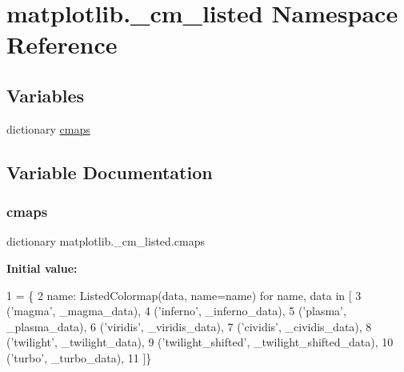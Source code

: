 \hypertarget{namespacematplotlib_1_1__cm__listed}{}\section{matplotlib.\+\_\+cm\+\_\+listed Namespace Reference}
\label{namespacematplotlib_1_1__cm__listed}
\subsection*{Variables}
\begin{DoxyCompactItemize}
\item 
dictionary \hyperlink{namespacematplotlib_1_1__cm__listed_af709fdc39f761677e124f6b4a5ec0ed9}{cmaps}
\end{DoxyCompactItemize}


\subsection{Variable Documentation}
\mbox{\label{namespacematplotlib_1_1__cm__listed_af709fdc39f761677e124f6b4a5ec0ed9}} 
\subsubsection{\texorpdfstring{cmaps}{cmaps}}
{\footnotesize\ttfamily dictionary matplotlib.\+\_\+cm\+\_\+listed.\+cmaps}

{\bfseries Initial value\+:}
\begin{DoxyCode}
1 =  \{
2     name: ListedColormap(data, name=name) \textcolor{keywordflow}{for} name, data \textcolor{keywordflow}{in} [
3         (\textcolor{stringliteral}{'magma'}, \_magma\_data),
4         (\textcolor{stringliteral}{'inferno'}, \_inferno\_data),
5         (\textcolor{stringliteral}{'plasma'}, \_plasma\_data),
6         (\textcolor{stringliteral}{'viridis'}, \_viridis\_data),
7         (\textcolor{stringliteral}{'cividis'}, \_cividis\_data),
8         (\textcolor{stringliteral}{'twilight'}, \_twilight\_data),
9         (\textcolor{stringliteral}{'twilight\_shifted'}, \_twilight\_shifted\_data),
10         (\textcolor{stringliteral}{'turbo'}, \_turbo\_data),
11     ]\}
\end{DoxyCode}
